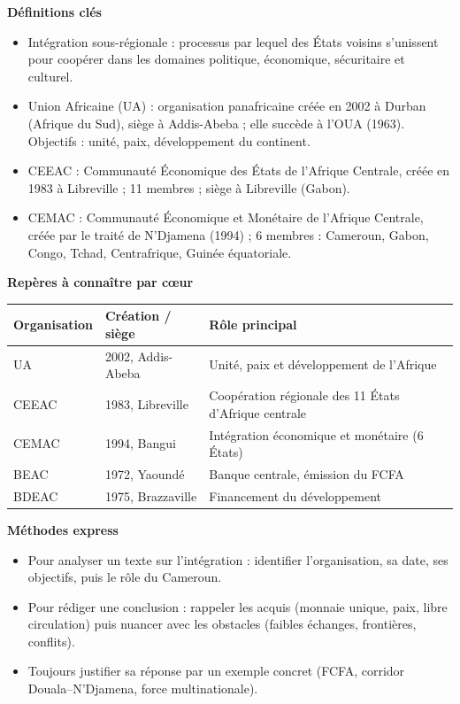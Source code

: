 \documentclass[11pt]{article}
\newcommand{\cle}[1]{{\popxbold\color{popdark}#1}}
\begin{document}
\begin{bilan}
\textbf{Définitions clés}
\begin{itemize}
\item \cle{Intégration sous-régionale} : processus par lequel des États voisins s'unissent pour coopérer dans les domaines politique, économique, sécuritaire et culturel.
\item \cle{Union Africaine (UA)} : organisation panafricaine créée en 2002 à Durban (Afrique du Sud), siège à Addis-Abeba ; elle succède à l'OUA (1963). Objectifs : unité, paix, développement du continent.
\item \cle{CEEAC} : Communauté Économique des États de l'Afrique Centrale, créée en 1983 à Libreville ; 11 membres ; siège à Libreville (Gabon).
\item \cle{CEMAC} : Communauté Économique et Monétaire de l'Afrique Centrale, créée par le traité de N'Djamena (1994) ; 6 membres : Cameroun, Gabon, Congo, Tchad, Centrafrique, Guinée équatoriale.
\end{itemize}

\textbf{Repères à connaître par c\oe ur}
\begin{center}
\begin{tabularx}{\linewidth}{|l|X|X|}\hline
\rowcolor{popblueL} \textbf{Organisation} & \textbf{Création / siège} & \textbf{Rôle principal} \\ \hline
UA & 2002, Addis-Abeba & Unité, paix et développement de l'Afrique \\ \hline
CEEAC & 1983, Libreville & Coopération régionale des 11 États d'Afrique centrale \\ \hline
CEMAC & 1994, Bangui & Intégration économique et monétaire (6 États) \\ \hline
BEAC & 1972, Yaoundé & Banque centrale, émission du FCFA \\ \hline
BDEAC & 1975, Brazzaville & Financement du développement \\ \hline
\end{tabularx}
\end{center}

\textbf{Méthodes express}
\begin{itemize}
\item Pour analyser un texte sur l'intégration : identifier l'organisation, sa date, ses objectifs, puis le rôle du Cameroun.
\item Pour rédiger une conclusion : rappeler les acquis (monnaie unique, paix, libre circulation) puis nuancer avec les obstacles (faibles échanges, frontières, conflits).
\item Toujours justifier sa réponse par un exemple concret (FCFA, corridor Douala--N'Djamena, force multinationale).
\end{itemize}
\end{bilan}
\end{document}
